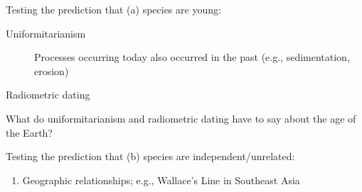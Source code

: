 \begin{frame}

    Testing the prediction that (a) species are young:

    \begin{description}
        \item[Uniformitarianism] Processes occurring today also occurred in the
            past (e.g., sedimentation, erosion) 
        \item[Radiometric dating]
    \end{description}

    What do uniformitarianism and radiometric dating have to say about the age
    of the Earth? \\



\end{frame}

\begin{frame}[t]

    Testing the prediction that (b) species are independent/unrelated:

    \begin{enumerate}
        \item Geographic relationships; e.g., Wallace's Line in Southeast Asia
    \end{enumerate}

\end{frame}

